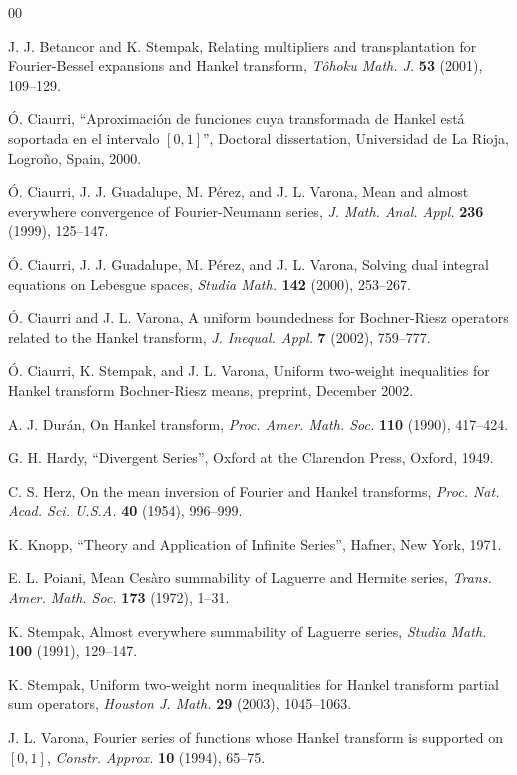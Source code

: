 \documentclass[a4paper]{amsart}
\begin{document}
\begin{thebibliography}{00}

 J. J. Betancor and K. Stempak,
Relating multipliers and transplantation for Fourier-Bessel expansions and
Hankel transform,
\textit{T\^ohoku Math. J.}
\textbf{53} (2001), 109--129.

 \'O. Ciaurri,
{``Aproximaci\'on de funciones cuya transformada de Hankel est\'a
soportada en el intervalo $[0,1]$''},
Doctoral dissertation,
Universidad de La Rioja, Logro\~no, Spain, 2000.

 \'O. Ciaurri, J. J. Guadalupe, M. P\'erez, and J. L. Varona,
Mean and almost everywhere convergence of Fourier-Neumann series,
\textit{J. Math. Anal. Appl.}
\textbf{236} (1999), 125--147.

 \'O. Ciaurri, J. J. Guadalupe, M. P\'erez, and J. L. Varona,
Solving dual integral equations on Lebesgue spaces,
\textit{Studia Math.}
\textbf{142} (2000), 253--267.

 \'O. Ciaurri and J. L. Varona,
A uniform boundedness for Bochner-Riesz operators related
to the Hankel transform,
\textit{J. Inequal. Appl.} \textbf{7} (2002), 759--777.

 \'O. Ciaurri, K. Stempak, and J. L. Varona,
Uniform two-weight inequalities for Hankel transform Bochner-Riesz means,
preprint, December 2002.

 A. J. Dur\'an,
On Hankel transform,
\textit{Proc. Amer. Math. Soc.}
\textbf{110} (1990), 417--424.

 G. H. Hardy,
{``Divergent Series''},
Oxford at the Clarendon Press, Oxford, 1949.

 C. S. Herz,
On the mean inversion of Fourier and Hankel transforms,
\textit{Proc. Nat. Acad. Sci. U.S.A.}
\textbf{40} (1954), 996--999.

 K. Knopp,
{``Theory and Application of Infinite Series''},
Hafner, New York, 1971.

 E. L. Poiani,
Mean Ces\`aro summability of Laguerre and Hermite series,
\textit{Trans. Amer. Math. Soc.}
\textbf{173} (1972), 1--31.

 K. Stempak,
Almost everywhere summability of Laguerre series,
\textit{Studia Math.}
\textbf{100} (1991), 129--147.

 K. Stempak,
Uniform two-weight norm inequalities for Hankel transform partial sum operators,
\textit{Houston J. Math.}
\textbf{29} (2003), 1045--1063.

 J. L. Varona,
Fourier series of functions whose Hankel transform is supported on $[0,1]$,
\textit{Constr. Approx.}
\textbf{10} (1994), 65--75.

\end{thebibliography}
\end{document}
